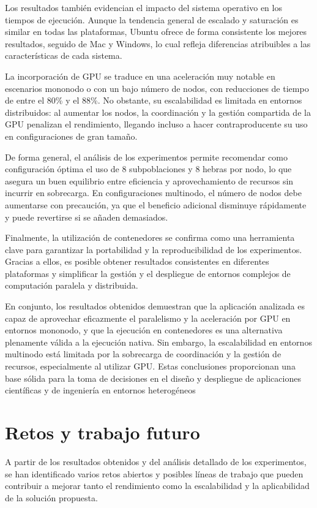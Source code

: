 Los resultados también evidencian el impacto del sistema operativo en los tiempos de ejecución. Aunque la tendencia general de escalado y saturación es similar en todas las plataformas, Ubuntu ofrece de forma consistente los mejores resultados, seguido de Mac y Windows, lo cual refleja diferencias atribuibles a las características de cada sistema.

La incorporación de GPU se traduce en una aceleración muy notable en escenarios mononodo o con un bajo número de nodos, con reducciones de tiempo de entre el 80\% y el 88\%. No obstante, su escalabilidad es limitada en entornos distribuidos: al aumentar los nodos, la coordinación y la gestión compartida de la GPU penalizan el rendimiento, llegando incluso a hacer contraproducente su uso en configuraciones de gran tamaño.

De forma general, el análisis de los experimentos permite recomendar como configuración óptima el uso de 8 subpoblaciones y 8 hebras por nodo, lo que asegura un buen equilibrio entre eficiencia y aprovechamiento de recursos sin incurrir en sobrecarga. En configuraciones multinodo, el número de nodos debe aumentarse con precaución, ya que el beneficio adicional disminuye rápidamente y puede revertirse si se añaden demasiados.

Finalmente, la utilización de contenedores se confirma como una herramienta clave para garantizar la portabilidad y la reproducibilidad de los experimentos. Gracias a ellos, es posible obtener resultados consistentes en diferentes plataformas y simplificar la gestión y el despliegue de entornos complejos de computación paralela y distribuida.

En conjunto, los resultados obtenidos demuestran que la aplicación analizada es capaz de aprovechar eficazmente el paralelismo y la aceleración por GPU en entornos mononodo, y que la ejecución en contenedores es una alternativa plenamente válida a la ejecución nativa. Sin embargo, la escalabilidad en entornos multinodo está limitada por la sobrecarga de coordinación y la gestión de recursos, especialmente al utilizar GPU. Estas conclusiones proporcionan una base sólida para la toma de decisiones en el diseño y despliegue de aplicaciones científicas y de ingeniería en entornos heterogéneos

\section{Retos y trabajo futuro}

A partir de los resultados obtenidos y del análisis detallado de los experimentos, se han identificado varios retos abiertos y posibles líneas de trabajo que pueden contribuir a mejorar tanto el rendimiento como la escalabilidad y la aplicabilidad de la solución propuesta.


